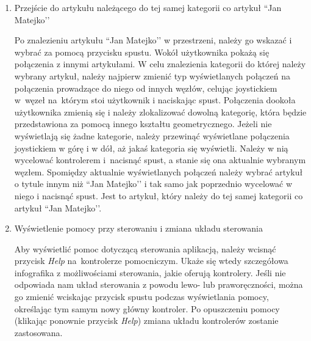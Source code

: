 \begin{enumerate}
\item Przejście do artykułu należącego do tej samej kategorii co artykuł ``Jan Matejko’’

    Po znalezieniu artykułu ``Jan Matejko’’ w przestrzeni, należy go wskazać i wybrać za pomocą przycisku spustu. Wokół użytkownika pokażą się połączenia z innymi artykułami. W celu znalezienia kategorii do której należy wybrany artykuł, należy najpierw zmienić typ wyświetlanych połączeń na połączenia prowadzące do niego od innych węzłów, celując joystickiem w~węzeł na~którym stoi użytkownik i naciskając spust. Połączenia dookoła użytkownika zmienią się i należy zlokalizować dowolną kategorię, która będzie przedstawiona za pomocą innego kształtu geometrycznego. Jeżeli nie wyświetlają się żadne kategorie, należy przewinąć wyświetlane połączenia joystickiem w górę i w dół, aż jakaś kategoria się wyświetli. Należy w nią wycelować kontrolerem i~nacisnąć spust, a stanie się ona aktualnie wybranym węzłem. Spomiędzy aktualnie wyświetlanych połączeń należy wybrać artykuł o tytule innym niż ``Jan Matejko’’ i tak samo jak poprzednio wycelować w niego i nacisnąć spust. Jest to artykuł, który należy do tej samej kategorii co artykuł ``Jan Matejko’’.
	
\item Wyświetlenie pomocy przy sterowaniu i zmiana układu sterowania

	Aby wyświetlić pomoc dotyczącą sterowania aplikacją, należy wcisnąć przycisk \textit{Help} na~kontrolerze pomocniczym. Ukaże się wtedy szczegółowa infografika z możliwościami sterowania, jakie oferują kontrolery. Jeśli nie odpowiada nam układ sterowania z powodu lewo- lub praworęczności, można go zmienić wciskając przycisk spustu podczas wyświetlania pomocy, określając tym samym nowy główny kontroler. Po opuszczeniu pomocy (klikając ponownie przycisk \textit{Help}) zmiana układu kontrolerów zostanie zastosowana.
\end{enumerate}
